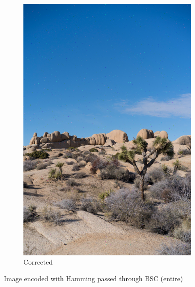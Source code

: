 \documentclass{article}
\begin{document}
\begin{figure}
\begin{subfigure}[b]{0.32\textwidth}
        \includegraphics[width=\textwidth]{../Result/hamming-bsc-output-corrected.png}
        \caption{Corrected}
        \label{fig:image-hamming-bsc-corrected}
    \end{subfigure}
       \caption{Image encoded with Hamming passed through BSC (entire)}
       \label{fig:image-hamming-bsc}
\end{figure}
\end{document}
